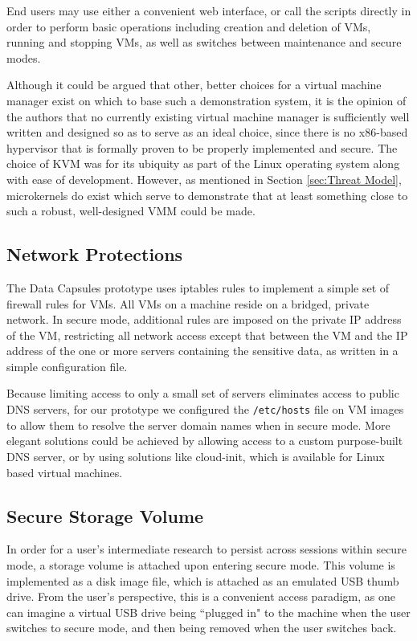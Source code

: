 \documentclass{acm_proc_article-sp}
\begin{document}
End users may use either a convenient web interface, or call the scripts
directly in order to perform basic operations including creation and deletion of
VMs, running and stopping VMs, as well as switches between maintenance and
secure modes.

Although it could be argued that other, better choices for a virtual machine
manager exist on which to base such a demonstration system, it is the opinion of
the authors that no currently existing virtual machine manager is sufficiently
well written and designed so as to serve as an ideal choice, since there is no
x86-based hypervisor that is formally proven to be properly implemented and
secure.  The choice of KVM was for its ubiquity as part of the Linux operating
system along with ease of development.  However, as mentioned in Section
\ref{sec:Threat Model}, microkernels do exist which serve to demonstrate that
at least something close to such a robust, well-designed VMM could be made.

\subsection{Network Protections}

The Data Capsules prototype uses iptables rules to implement a simple set of
firewall rules for VMs.  All VMs on a machine reside on a bridged, private
network.  In secure mode, additional rules are imposed on the private IP address
of the VM, restricting all network access except that between the VM and the IP
address of the one or more servers containing the sensitive data, as written in
a simple configuration file.  

Because limiting access to only a small set of servers eliminates access to
public DNS servers, for our prototype we configured the \texttt{/etc/hosts} file
on VM images to allow them to resolve the server domain names when in secure
mode.  More elegant solutions could be achieved by allowing access to a
custom purpose-built DNS server, or by using solutions like cloud-init, which is
available for Linux based virtual machines.

\subsection{Secure Storage Volume}

In order for a user's intermediate research to persist across sessions within
secure mode, a storage volume is attached upon entering secure mode.  This
volume is implemented as a disk image file, which is attached as an emulated USB
thumb drive.  From the user's perspective, this is a convenient access paradigm,
as one can imagine a virtual USB drive being ``plugged in" to the machine when
the user switches to secure mode, and then being removed when the user switches
back.
\end{document}
